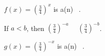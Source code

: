 \documentclass{ximera}
\begin{document}
\begin{example}
\begin{question}
$f(x) = \left( \frac{3}{4} \right)^{x}$  is a(n) \,  .  \\



\end{question}




















\begin{question}



If $a < b$, then $\left( \frac{3}{4} \right)^{-a}$ \, \wordChoice{\choice[correct]{<} \choice{>}} \, $\left( \frac{3}{4} \right)^{-b}$.  \\



\end{question}





\begin{question}



$g(x) = \left( \frac{3}{4} \right)^{-x}$  is a(n) \,  .  \\



\end{question}








\end{example}
\end{document}
